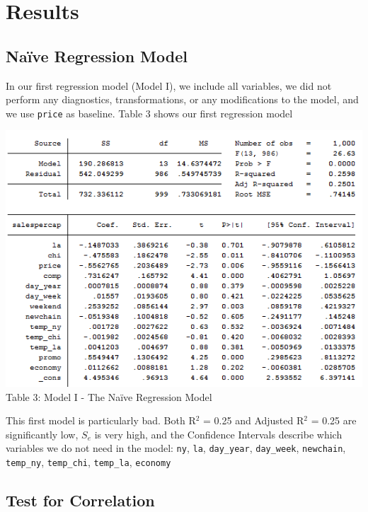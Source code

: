 \documentclass[10pt]{article}
\begin{document}

\section{Results}

\subsection{Na\"{i}ve Regression Model}
In our first regression model (Model I), we include all variables, we did not perform any diagnostics, transformations, or any modifications to the model, and we use {\tt price} as baseline. Table 3 shows our first regression model

\begin{center}
\includegraphics[scale=0.8]{g10.png}\\
Table 3: Model I - The Na\"{i}ve Regression Model
\end{center}

This first model is particularly bad. Both R$^2$ = 0.25 and Adjusted R$^2$ = 0.25 are significantly low, $S_e$ is very high, and the Confidence Intervals describe which variables we do not need in the model: {\tt ny}, {\tt la}, {\tt day\_year}, {\tt day\_week}, {\tt newchain}, {\tt temp\_ny}, {\tt temp\_chi}, {\tt temp\_la}, {\tt economy}  

\subsection{Test for Correlation}
\end{document}
